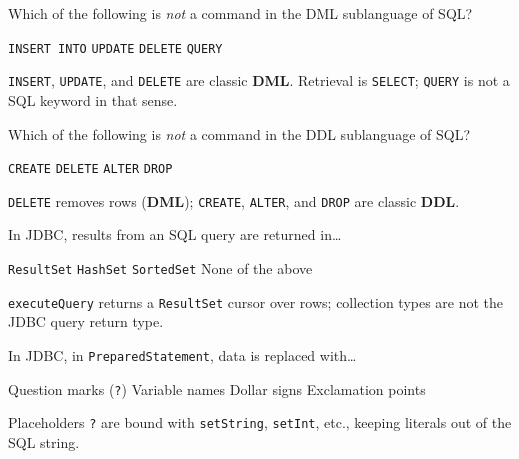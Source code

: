 \newpage


\question[4]
Which of the following is \emph{not} a command in the DML sublanguage of SQL?
\begin{choices}
  \choice \lstinline[style=sqlinline]!INSERT INTO!
  \choice \lstinline[style=sqlinline]!UPDATE!
  \choice \lstinline[style=sqlinline]!DELETE!
  \CorrectChoice \lstinline[style=sqlinline]!QUERY!
\end{choices}
\begin{solution}
  \texttt{INSERT}, \texttt{UPDATE}, and \texttt{DELETE} are classic \textbf{DML}. Retrieval is \texttt{SELECT}; \texttt{QUERY} is not a SQL keyword in that sense.
\end{solution}

\question[4]
Which of the following is \emph{not} a command in the DDL sublanguage of SQL?
\begin{choices}
  \choice \lstinline[style=sqlinline]!CREATE!
  \CorrectChoice \lstinline[style=sqlinline]!DELETE!
  \choice \lstinline[style=sqlinline]!ALTER!
  \choice \lstinline[style=sqlinline]!DROP!
\end{choices}
\begin{solution}
  \texttt{DELETE} removes rows (\textbf{DML}); \texttt{CREATE}, \texttt{ALTER}, and \texttt{DROP} are classic \textbf{DDL}.
\end{solution}

\newpage


\question[4]
In JDBC, results from an SQL query are returned in\ldots
\begin{choices}
  \CorrectChoice \texttt{ResultSet}
  \choice \texttt{HashSet}
  \choice \texttt{SortedSet}
  \choice None of the above
\end{choices}
\begin{solution}
  \texttt{executeQuery} returns a \texttt{ResultSet} cursor over rows; collection types are not the JDBC query return type.
\end{solution}

\question[4]
In JDBC, in \texttt{PreparedStatement}, data is replaced with\ldots
\begin{choices}
  \CorrectChoice Question marks (\texttt{?})
  \choice Variable names
  \choice Dollar signs
  \choice Exclamation points
\end{choices}
\begin{solution}
  Placeholders \texttt{?} are bound with \texttt{setString}, \texttt{setInt}, etc., keeping literals out of the SQL string.
\end{solution}

